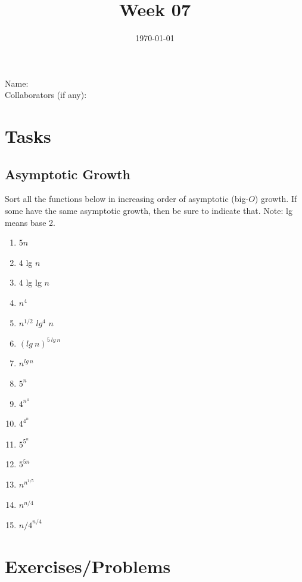 \documentclass[12pt]{amsart}
\title{Week 07}
\date{\today}
\begin{document}
\maketitle


Name: 
\\

Collaborators (if any): 

\section{Tasks}

\subsection{Asymptotic Growth}
Sort all the functions below in increasing order of asymptotic (big-$O$) growth. If some have the
same asymptotic growth, then be sure to indicate that. Note: lg means base 2. 
\begin{enumerate}
\item $5n$
\item $4$ lg $n$
\item $4$ lg lg $n$
\item $n^4$
\item $n^{1/2}$ $lg^4$ $n$
\item $(lg \: n)^{5\:lg\:n}$
\item $n^{lg\:n}$
\item $5^n$
\item $4^{n^4}$
\item $4^{4^n}$
\item $5^{5^n}$
\item $5^{5n}$
\item $n^{n^{1/5}}$
\item $n^{n/4}$
\item ${n/4}^{n/4}$
\end{enumerate}

\section{Exercises/Problems}
\end{document}

